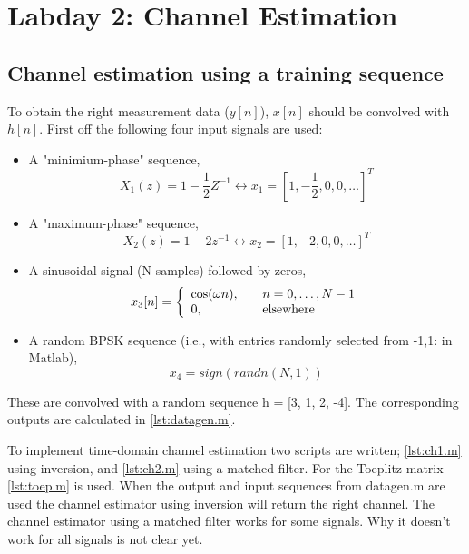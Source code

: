 \documentclass[final]{scrreprt} %
\begin{document}
\section{Labday 2: Channel Estimation}
\label{ch:labday2}

\subsection{Channel estimation using a training sequence}

To obtain the right measurement data ($y[n]$), $x[n]$ should be convolved with $h[n]$.
First off the following four input signals are used:

\begin{itemize}
\item 	A "minimium-phase" sequence, 
\begin{equation}
X_1(z) = 1 - \dfrac{1}{2}Z^{-1} \leftrightarrow x_1 = [1, -\dfrac{1}{2}, 0, 0,  \dots]^T
\end{equation}
\item A "maximum-phase" sequence,
\begin{equation}
X_2(z) = 1 - 2z^{-1} \leftrightarrow x_2 = [1, -2, 0, 0, \dots]^T
\end{equation}
\item A sinusoidal signal (N samples) followed by zeros,
\[ x_3[n] = \left\{ 
  \begin{array}{l l}
    \cos(\omega n), & \quad n = 0, \dots ,N - 1\\
    0, & \quad \textrm{elsewhere}
  \end{array} \right.\]
\item A random BPSK sequence (i.e., with entries randomly selected from {-1,1}: in Matlab),
\begin{equation}
x_4 = sign(randn(N,1))
\end{equation}
\end{itemize}

These are convolved with a random sequence h = [3, 1, 2, -4]. The corresponding outputs are calculated in \ref{lst:datagen.m}.

To implement time-domain channel estimation two scripts are written; \ref{lst:ch1.m} using inversion, and \ref{lst:ch2.m} using a matched filter. For the Toeplitz matrix \ref{lst:toep.m} is used.
When the output and input sequences from datagen.m are used the channel estimator using inversion will return the right channel.
The channel estimator using a matched filter works for some signals.
Why it doesn't work for all signals is not clear yet.
\end{document}
